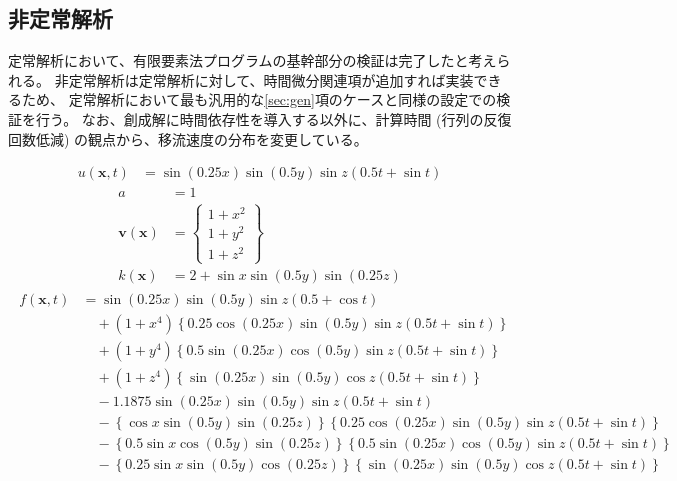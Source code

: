 \documentclass[8pt,a4paper]{article}
\newcommand{\bsm}{\boldsymbol}
\begin{document}
\subsection{非定常解析}
定常解析において、有限要素法プログラムの基幹部分の検証は完了したと考えられる。
非定常解析は定常解析に対して、時間微分関連項が追加すれば実装できるため、
定常解析において最も汎用的な\ref{sec:gen}項のケースと同様の設定での検証を行う。
なお、創成解に時間依存性を導入する以外に、計算時間 (行列の反復回数低減) の観点から、移流速度の分布を変更している。

\begin{align}
	u (\bsm{x}, t) &= \sin \left( 0.25 x \right) \sin \left( 0.5 y \right) \sin z \left( 0.5 t + \sin t \right)
\end{align}
\begin{align}
	a &= 1 \\
	\bsm{v} (\bsm{x}) &= 
	\begin{Bmatrix}
		1 + x^2 \\
		1 + y^2 \\
		1 + z^2
	\end{Bmatrix} \\
	k (\bsm{x}) &= 2 + \sin x \sin \left( 0.5 y \right) \sin \left( 0.25 z \right)
\end{align}
\begin{align}
	\begin{split}
		f (\bsm{x}, t) &= \sin \left( 0.25 x \right) \sin \left( 0.5 y \right) \sin z \left( 0.5 + \cos t \right) \\
		& \quad + \left( 1 + x^4 \right) \left\{ 0.25 \cos \left( 0.25 x \right) \sin \left( 0.5 y \right) \sin z \left( 0.5 t + \sin t \right) \right\} \\
		& \quad + \left( 1 + y^4 \right) \left\{ 0.5  \sin \left( 0.25 x \right) \cos \left( 0.5 y \right) \sin z \left( 0.5 t + \sin t \right) \right\} \\
		& \quad + \left( 1 + z^4 \right) \left\{      \sin \left( 0.25 x \right) \sin \left( 0.5 y \right) \cos z \left( 0.5 t + \sin t \right) \right\} \\
		& \quad - 1.1875 \sin \left( 0.25 x \right) \sin \left( 0.5 y \right) \sin z \left( 0.5 t + \sin t \right) \\
		& \quad - \left\{     \cos x \sin \left( 0.5 y \right) \sin \left( 0.25 z \right) \right\} \left\{ 0.25 \cos \left( 0.25 x \right) \sin \left( 0.5 y \right) \sin z \left( 0.5 t + \sin t \right) \right\} \\
		& \quad - \left\{0.5  \sin x \cos \left( 0.5 y \right) \sin \left( 0.25 z \right) \right\} \left\{ 0.5  \sin \left( 0.25 x \right) \cos \left( 0.5 y \right) \sin z \left( 0.5 t + \sin t \right) \right\} \\
		& \quad - \left\{0.25 \sin x \sin \left( 0.5 y \right) \cos \left( 0.25 z \right) \right\} \left\{      \sin \left( 0.25 x \right) \sin \left( 0.5 y \right) \cos z \left( 0.5 t + \sin t \right) \right\} 
	\end{split}
\end{align}
\end{document}
